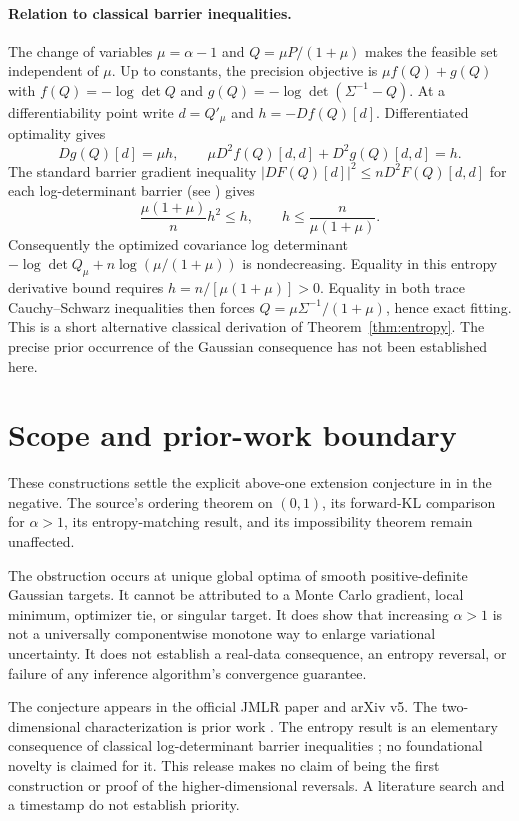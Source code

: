 \documentclass[11pt]{article}
\theoremstyle{remark}\newtheorem{remark}[theorem]{Remark}
\begin{document}
\paragraph{Relation to classical barrier inequalities.}
The change of variables $\mu=\alpha-1$ and
$Q=\mu P/(1+\mu)$ makes the feasible set independent of $\mu$.
Up to constants, the precision objective is
$\mu f(Q)+g(Q)$ with
$f(Q)=-\log\det Q$ and $g(Q)=-\log\det(\Sigma^{-1}-Q)$.
At a differentiability point write $d=Q'_\mu$ and
$h=-Df(Q)[d]$. Differentiated optimality gives
\[
 Dg(Q)[d]=\mu h,\qquad
 \mu D^2f(Q)[d,d]+D^2g(Q)[d,d]=h.
\]
The standard barrier gradient inequality
$|DF(Q)[d]|^2\le nD^2F(Q)[d,d]$ for each log-determinant
barrier (see \cite[Definition 2.1, Eq.~(2.4)]{nemirovski-todd}) gives
\[
 \frac{\mu(1+\mu)}{n}h^2\le h,\qquad
 h\le\frac{n}{\mu(1+\mu)}.
\]
Consequently the optimized covariance log determinant
$-\log\det Q_\mu+n\log(\mu/(1+\mu))$ is nondecreasing.
Equality in this entropy derivative bound requires
$h=n/[\mu(1+\mu)]>0$. Equality in both trace Cauchy--Schwarz
inequalities then forces
$Q=\mu\Sigma^{-1}/(1+\mu)$, hence exact fitting.
This is a short alternative classical derivation of
Theorem~\ref{thm:entropy}. The precise prior occurrence of the
Gaussian consequence has not been established here.

\section{Scope and prior-work boundary}
These constructions settle the explicit above-one extension
conjecture in \cite{mps} in the negative. The source's ordering theorem on $(0,1)$,
its forward-KL comparison for $\alpha>1$, its entropy-matching
result, and its impossibility theorem remain unaffected.

The obstruction occurs at unique global optima of smooth
positive-definite Gaussian targets. It cannot be attributed to a
Monte Carlo gradient, local minimum, optimizer tie, or singular target.
It does show that increasing $\alpha>1$ is not a universally
componentwise monotone way to enlarge variational uncertainty.
It does not establish a real-data consequence, an entropy reversal,
or failure of any inference algorithm's convergence guarantee.

The conjecture appears in the official JMLR paper and arXiv v5.
The two-dimensional characterization is prior work
\cite[Appendix B]{li-turner}. The entropy result is an elementary
consequence of classical log-determinant barrier inequalities
\cite{nemirovski-todd}; no foundational novelty is claimed for it.
This release makes no claim of being the first construction or proof
of the higher-dimensional reversals. A literature search and a
timestamp do not establish priority.
\end{document}
